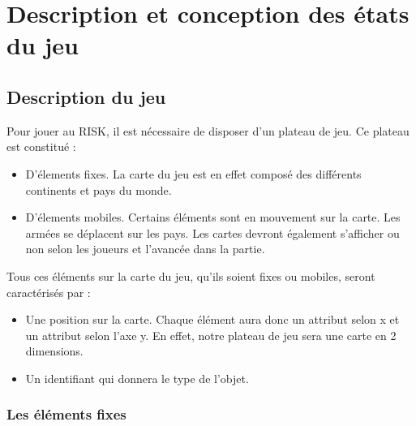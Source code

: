 \section{Description et conception des états du jeu}

\subsection{Description du jeu}

Pour jouer au RISK, il est nécessaire de disposer d'un plateau de jeu. Ce plateau est constitué : 

\begin{itemize}
    \item D'élements fixes. La carte du jeu est en effet composé des différents continents et pays du monde. 
    \item D'élements mobiles. Certains éléments sont en mouvement sur la carte. Les armées se déplacent sur les pays. Les cartes devront également s'afficher ou non selon les joueurs et l'avancée dans la partie.
    \newline
\end{itemize}

Tous ces éléments sur la carte du jeu, qu'ils soient fixes ou mobiles, seront caractérisés par :
\begin{itemize}
    \item Une position sur la carte. Chaque élément aura donc un attribut selon x et un attribut selon l'axe y. En effet, notre plateau de jeu sera une carte en 2 dimensions. 
    \item Un identifiant qui donnera le type de l'objet. 
\end{itemize}

\subsubsection{Les éléments fixes}

